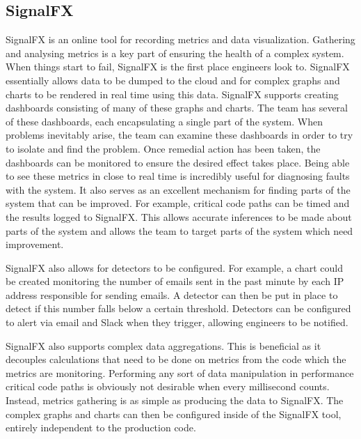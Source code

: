 \subsection{SignalFX}
SignalFX \cite{sigfx} is an online tool for recording metrics and data visualization. Gathering and analysing metrics is a key part of ensuring the health of a complex system. When things start to fail, SignalFX is the first place engineers look to. SignalFX essentially allows data to be dumped to the cloud and for complex graphs and charts to be rendered in real time using this data. SignalFX supports creating dashboards consisting of many of these graphs and charts. The \team{} team has several of these dashboards, each encapsulating a single part of the system. When problems inevitably arise, the team can examine these dashboards in order to try to isolate and find the problem. Once remedial action has been taken, the dashboards can be monitored to ensure the desired effect takes place. Being able to see these metrics in close to real time is incredibly useful for diagnosing faults with the system. It also serves as an excellent mechanism for finding parts of the system that can be improved. For example, critical code paths can be timed and the results logged to SignalFX. This allows accurate inferences to be made about parts of the system and allows the team to target parts of the system which need improvement.

SignalFX also allows for detectors to be configured. For example, a chart could be created monitoring the number of emails sent in the past minute by each IP address responsible for sending emails. A detector can then be put in place to detect if this number falls below a certain threshold. Detectors can be configured to alert via email and Slack when they trigger, allowing engineers to be notified. 

SignalFX also supports complex data aggregations. This is beneficial as it decouples calculations that need to be done on metrics from the code which the metrics are monitoring. Performing any sort of data manipulation in performance critical code paths is obviously not desirable when every millisecond counts. Instead, metrics gathering is as simple as producing the data to SignalFX. The complex graphs and charts can then be configured inside of the SignalFX tool, entirely independent to the production code. 